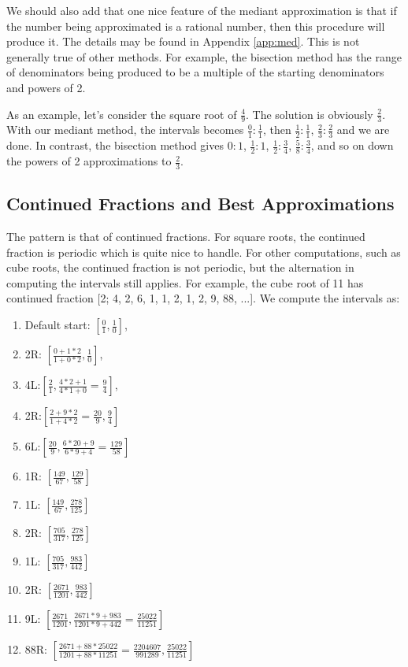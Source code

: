 \documentclass[12pt]{article}
\begin{document}
We should also add that one nice feature of the mediant approximation is that if the number being approximated is a rational number, then this procedure will produce it. The details may be found in Appendix \ref{app:med}. This is not generally true of other methods. For example, the bisection method has the range of denominators being produced to be a multiple of the starting denominators and powers of 2. 

As an example, let's consider the square root of $\frac{4}{9}$. The solution is obviously $\frac{2}{3}$. With our mediant method, the intervals becomes $\frac{0}{1}:\frac{1}{1}$, then $\frac{1}{2}:\frac{1}{1}$, $\frac{2}{3}:\frac{2}{3}$ and we are done. In contrast, the bisection method gives $0:1$, $\frac{1}{2}:1$, $\frac{1}{2}:\frac{3}{4}$, $\frac{5}{8}:\frac{3}{4}$, and so on down the powers of 2 approximations to $\frac{2}{3}$. 

\subsection{Continued Fractions and Best Approximations}


The pattern is that of continued fractions. For square roots, the continued fraction is periodic which is quite nice to handle. For other computations, such as cube roots, the continued fraction is not periodic, but the alternation in computing the intervals still applies. For example, the cube root of 11 has continued fraction [2; 4, 2, 6, 1, 1, 2, 1, 2, 9, 88, ...]. We compute the intervals as:  
\begin{enumerate}
\item Default start: $[\frac{0}{1}, \frac{1}{0}]$, 
\item 2R: $[\frac{0+1*2}{1+0*2}, \frac{1}{0}]$, 
\item 4L:$[\frac{2}{1}, \frac{4*2+1}{4*1+0} =\frac{9}{4}]$, 
\item 2R:$[\frac{2+9*2}{1+4*2} = \frac{20}{9}, \frac{9}{4}]$
\item 6L:$[\frac{20}{9}, \frac{6*20+9}{6*9 + 4} = \frac{129}{58}]$
\item 1R: $[\frac{149}{67}, \frac{129}{58}]$
\item 1L: $[\frac{149}{67}, \frac{278}{125}]$
\item 2R: $[\frac{705}{317}, \frac{278}{125}]$
\item 1L: $[\frac{705}{317}, \frac{983}{442}]$
\item 2R: $[\frac{2671}{1201}, \frac{983}{442}]$
\item 9L: $[\frac{2671}{1201}, \frac{2671*9+983}{1201*9+442} = \frac{25022}{11251}]$
\item 88R: $[\frac{2671+88*25022}{1201+88*11251} = \frac{2204607}{991289}, \frac{25022}{11251}]$
\end{enumerate}
\end{document}
